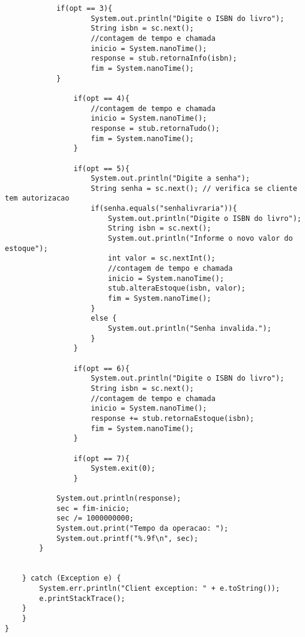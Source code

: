 \documentclass[11pt, brazil]{article} %
\begin{document}
\begin{verbatim}
	    	if(opt == 3){
                    System.out.println("Digite o ISBN do livro");
                    String isbn = sc.next();
                    //contagem de tempo e chamada
                    inicio = System.nanoTime();
                    response = stub.retornaInfo(isbn);
                    fim = System.nanoTime();
	    	}

                if(opt == 4){
                    //contagem de tempo e chamada
                    inicio = System.nanoTime();
                    response = stub.retornaTudo();
                    fim = System.nanoTime();
                }
                
                if(opt == 5){
                    System.out.println("Digite a senha");
                    String senha = sc.next(); // verifica se cliente tem autorizacao
                    if(senha.equals("senhalivraria")){
                        System.out.println("Digite o ISBN do livro");
                        String isbn = sc.next();
                        System.out.println("Informe o novo valor do estoque");
                        int valor = sc.nextInt();
                        //contagem de tempo e chamada
                        inicio = System.nanoTime();
                        stub.alteraEstoque(isbn, valor);
                        fim = System.nanoTime();
                    }
                    else {
                        System.out.println("Senha invalida.");
                    }
                }

                if(opt == 6){
                    System.out.println("Digite o ISBN do livro");
                    String isbn = sc.next();
                    //contagem de tempo e chamada
                    inicio = System.nanoTime();
                    response += stub.retornaEstoque(isbn);
                    fim = System.nanoTime();
                }
                
                if(opt == 7){
                    System.exit(0);
                }
	    	
	    	System.out.println(response);
	    	sec = fim-inicio;
	    	sec /= 1000000000;
	    	System.out.print("Tempo da operacao: ");
	    	System.out.printf("%.9f\n", sec);
	    }
            
	    
	} catch (Exception e) {
	    System.err.println("Client exception: " + e.toString());
	    e.printStackTrace();
	}
    }
}
\end{verbatim}
\end{document}
